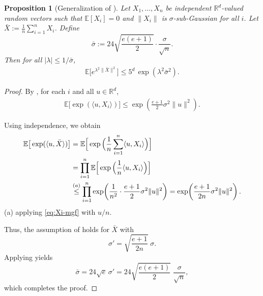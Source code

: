 \documentclass[10pt]{article}
\newtheorem{proposition}[proposition]{Proposition}
\begin{document}
\begin{proposition}[Generalization of ]\label{prop:minibatch}
Let $X_1,\dots,X_n$ be independent $\mathbb{R}^d$-valued random vectors such that
$\mathbb{E}[X_i]=0$ and $\|X_i\|$ is $\sigma$-sub-Gaussian for all $i$.
Let $\bar{X} := \frac{1}{n}\sum_{i=1}^n X_i$.
Define
\[
\bar{\sigma}
:= 24\sqrt{\frac{e(e+1)}{2}}\cdot \frac{\sigma}{\sqrt{n}}.
\]
Then for all $|\lambda|\le 1/\bar{\sigma}$,
\begin{align*}
\mathbb{E}\big[e^{\lambda^2\|\bar{X}\|^2}\big]
\le 5^d\, \exp(\lambda^2\bar{\sigma}^2).
\end{align*}
\end{proposition}

\begin{proof}
By , for each $i$ and all $u\in\mathbb{R}^d$,
\begin{align}
\mathbb{E}\big[\exp(\langle u,X_i\rangle)\big]
\le \exp\!\left(\frac{e+1}{2}\sigma^2\|u\|^2\right).
\label{eq:Xi-mgf}
\end{align}

Using independence, we obtain
\begin{align}
\mathbb{E}\big[\exp(\langle u,\bar{X}\rangle)\big]
&=
\mathbb{E}\Big[\exp\Big(\frac{1}{n}\sum_{i=1}^n \langle u,X_i\rangle\Big)\Big] \notag\\
&=
\prod_{i=1}^n
\mathbb{E}\Big[\exp\Big(\frac{1}{n}\langle u,X_i\rangle\Big)\Big] \notag\\
&\overset{(a)}{\le}
\prod_{i=1}^n
\exp\!\left(\frac{1}{n^2}\cdot\frac{e+1}{2}\sigma^2\|u\|^2\right)
=
\exp\!\left(\frac{e+1}{2n}\sigma^2\|u\|^2\right).
\label{eq:barX-mgf}
\end{align}
(a)\; applying \eqref{eq:Xi-mgf} with $u/n$.

Thus, the assumption of  holds for $\bar{X}$ with
\[
\sigma'=\sqrt{\frac{e+1}{2n}}\;\sigma .
\]
Applying  yields
\[
\bar{\sigma}
=
24\sqrt{e}\,\sigma'
=
24\sqrt{\frac{e(e+1)}{2}}\;\frac{\sigma}{\sqrt{n}},
\]
which completes the proof.

\end{proof}
\end{document}
